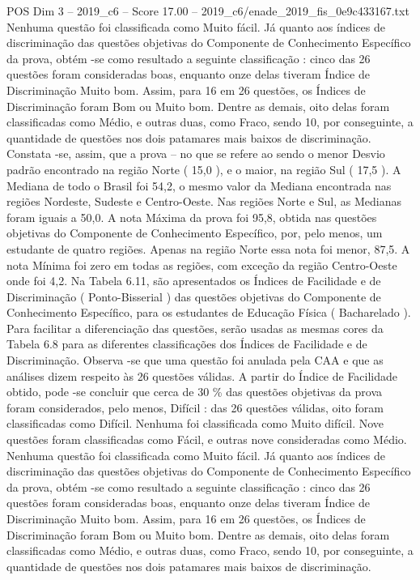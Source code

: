\begin{textsample}{POS Dim 3 – 2019\_c6 – Score 17.00 – 2019\_c6/enade\_2019\_fis\_0e9c433167.txt}
Nenhuma questão foi classificada como Muito fácil.
Já quanto aos índices de discriminação das questões objetivas do Componente de Conhecimento Específico da prova, obtém -se como resultado a seguinte classificação : cinco das 26 questões foram consideradas boas, enquanto onze delas tiveram Índice de Discriminação Muito bom.
Assim, para 16 em 26 questões, os Índices de Discriminação foram Bom ou Muito bom.
Dentre as demais, oito delas foram classificadas como Médio, e outras duas, como Fraco, sendo 10, por conseguinte, a quantidade de questões nos dois patamares mais baixos de discriminação.
Constata -se, assim, que a prova – no que se refere ao sendo o menor Desvio padrão encontrado na região Norte ( 15,0 ), e o maior, na região Sul ( 17,5 ).
A Mediana de todo o Brasil foi 54,2, o mesmo valor da Mediana encontrada nas regiões Nordeste, Sudeste e Centro-Oeste.
Nas regiões Norte e Sul, as Medianas foram iguais a 50,0.
A nota Máxima da prova foi 95,8, obtida nas questões objetivas do Componente de Conhecimento Específico, por, pelo menos, um estudante de quatro regiões.
Apenas na região Norte essa nota foi menor, 87,5.
A nota Mínima foi zero em todas as regiões, com exceção da região Centro-Oeste onde foi 4,2.
Na Tabela 6.11, são apresentados os Índices de Facilidade e de Discriminação ( Ponto-Bisserial ) das questões objetivas do Componente de Conhecimento Específico, para os estudantes de Educação Física ( Bacharelado ).
Para facilitar a diferenciação das questões, serão usadas as mesmas cores da Tabela 6.8 para as diferentes classificações dos Índices de Facilidade e de Discriminação.
Observa -se que uma questão foi anulada pela CAA e que as análises dizem respeito às 26 questões válidas.
A partir do Índice de Facilidade obtido, pode -se concluir que cerca de 30 \% das questões objetivas da prova foram considerados, pelo menos, Difícil : das 26 questões válidas, oito foram classificadas como Difícil.
Nenhuma foi classificada como Muito difícil.
Nove questões foram classificadas como Fácil, e outras nove consideradas como Médio.
Nenhuma questão foi classificada como Muito fácil.
Já quanto aos índices de discriminação das questões objetivas do Componente de Conhecimento Específico da prova, obtém -se como resultado a seguinte classificação : cinco das 26 questões foram consideradas boas, enquanto onze delas tiveram Índice de Discriminação Muito bom.
Assim, para 16 em 26 questões, os Índices de Discriminação foram Bom ou Muito bom.
Dentre as demais, oito delas foram classificadas como Médio, e outras duas, como Fraco, sendo 10, por conseguinte, a quantidade de questões nos dois patamares mais baixos de discriminação.

\end{textsample}
